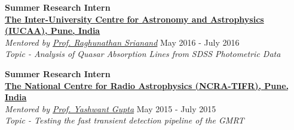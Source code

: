 \documentclass[11pt, margin, centered, letterpaper]{res}
\begin{document}
\begin{resume}

\textbf{Summer Research Intern}
\\
\textbf{\href{http://www.iucaa.ernet.in/}{The Inter-University Centre for Astronomy and Astrophysics (IUCAA), Pune, India}}
\\
\emph{Mentored by \href{http://www.iucaa.ernet.in/~anand/}{Prof. Raghunathan Srianand}} \hfill May 2016 - July 2016\\
\textit{Topic - Analysis of Quasar Absorption Lines from SDSS Photometric Data}

\textbf{Summer Research Intern}\\
\textbf{\href{http://www.ncra.tifr.res.in/}{The National Centre for Radio Astrophysics (NCRA-TIFR), Pune, India}}\\
\emph{Mentored by \href{http://www.ncra.tifr.res.in/ncra/people/academic/ncra-faculty/Yashwant_Gupta}{Prof. Yashwant Gupta}} \hfill May 2015 - July 2015\\
\textit{Topic - Testing the fast transient detection pipeline of the GMRT}

\begin{comment}



\end{comment}
\end{resume}
\end{document}

